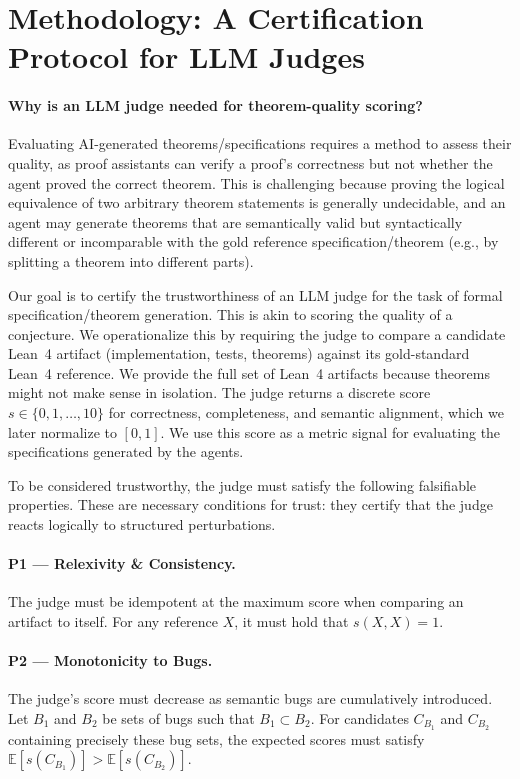 \section{Methodology: A Certification Protocol for LLM Judges}

\paragraph{Why is an LLM judge needed for theorem-quality scoring?}
Evaluating AI-generated theorems/specifications requires a method to assess their quality, as proof assistants can verify a proof's correctness but not whether the agent proved the correct theorem.
This is challenging because proving the logical equivalence of two arbitrary theorem statements is generally undecidable, and an agent may generate theorems that are semantically valid but syntactically different or incomparable with the gold reference specification/theorem (e.g., by splitting a theorem into different parts).

Our goal is to certify the trustworthiness of an LLM judge for the task of formal specification/theorem generation.
This is akin to scoring the quality of a conjecture.
We operationalize this by requiring the judge to compare a candidate Lean~4 artifact (implementation, tests, theorems) against its gold-standard Lean~4 reference.
We provide the full set of Lean~4 artifacts because theorems might not make sense in isolation.
The judge returns a discrete score $s\in\{0,1,\dots,10\}$ for correctness, completeness, and semantic alignment, which we later normalize to $[0,1]$.
We use this score as a metric signal for evaluating the specifications generated by the agents.

To be considered trustworthy, the judge must satisfy the following falsifiable properties.
These are necessary conditions for trust: they certify that the judge reacts logically to structured perturbations.

\paragraph{P1 — Relexivity \& Consistency.}
The judge must be idempotent at the maximum score when comparing an artifact to itself.
For any reference $X$, it must hold that $s(X,X)=1$.

\paragraph{P2 — Monotonicity to Bugs.}
The judge’s score must decrease as semantic bugs are cumulatively introduced. Let $B_1$ and $B_2$ be sets of bugs such that $B_1 \subset B_2$. For candidates $C_{B_1}$ and $C_{B_2}$ containing precisely these bug sets, the expected scores must satisfy $\mathbb{E}[s(C_{B_1})] > \mathbb{E}[s(C_{B_2})]$.

